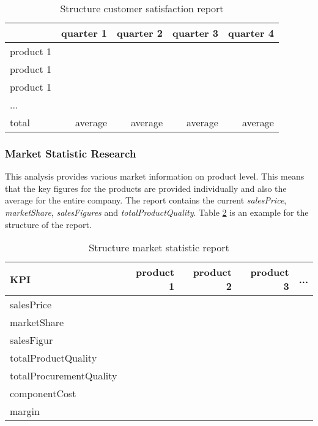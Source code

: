\begin{table}[ht]
\centering
\begin{tabular}{|l|r|r|r|r|}
\hline
& \textbf{quarter 1}   & \textbf{quarter 2}  & \textbf{quarter 3} & \textbf{quarter 4} \\ \hline
product 1   &             &            &           &           \\
product 1   &             &            &           &           \\
product 1   &             &            &           &           \\
...         &             &            &           &           \\
total       & average     & average    & average   & average   \\
\hline
\end{tabular}
\caption{Structure customer satisfaction report}
\label{MR_customer_satisfaction}
\end{table}

\subsubsection{Market Statistic Research}
This analysis provides various market information on product level. This means that the key figures for the products are provided individually and also the average for the entire company. The report contains the current \textit{salesPrice}, \textit{marketShare}, \textit{salesFigures} and \textit{totalProductQuality}. Table \ref{MR_market_statistic} is an example for the structure of the report. \\

\begin{table}[ht]
\centering
\begin{tabular}{|l|r|r|r|r|}
\hline
\textbf{KPI} & \textbf{product 1}   & \textbf{product 2}  & \textbf{product 3} & \textbf{...}  \\ \hline
salesPrice          &             &            &           &           \\
marketShare         &             &            &           &           \\
salesFigur          &             &            &           &           \\
totalProductQuality &             &            &           &           \\
totalProcurementQuality  &        &            &           &           \\
componentCost       &             &            &           &           \\
margin              &             &            &           &           \\
\hline
\end{tabular}
\caption{Structure market statistic report}
\label{MR_market_statistic}
\end{table}